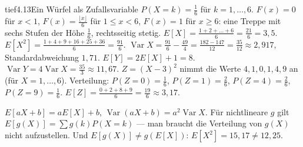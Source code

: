 \begin{loesungkarte}{tief}{4.13}{Ein Würfel als Zufallsvariable}
$P(X = k) = \frac16$ für $k = 1, \dots, 6$. $F(x) = 0$ für $x < 1$, $F(x) = \frac{\lfloor x\rfloor}6$ für $1\le x < 6$, $F(x) = 1$ für $x\ge6$: eine Treppe mit sechs Stufen der Höhe $\frac16$, rechtsseitig stetig.
$E[X] = \frac{1 + 2 + \dots + 6}6 = \frac{21}6 = 3{,}5$. $E[X^{2}] = \frac{1 + 4 + 9 + 16 + 25 + 36}6 = \frac{91}6$. $\operatorname{Var}X = \frac{91}6 - \frac{49}4 = \frac{182 - 147}{12} = \frac{35}{12}\approx2{,}917$, Standardabweichung $1{,}71$.
$E[Y] = 2E[X] + 1 = 8$. $\operatorname{Var}Y = 4\operatorname{Var}X = \frac{35}3\approx11{,}67$.
$Z = (X - 3)^{2}$ nimmt die Werte $4, 1, 0, 1, 4, 9$ an (für $X = 1, \dots, 6$). Verteilung: $P(Z = 0) = \frac16$, $P(Z = 1) = \frac26$, $P(Z = 4) = \frac26$, $P(Z = 9) = \frac16$. $E[Z] = \frac{0 + 2 + 8 + 9}6 = \frac{19}6\approx3{,}17$.
\begin{mitnehmen}\kastentext
$E[aX + b] = aE[X] + b$, $\operatorname{Var}(aX + b) = a^{2}\operatorname{Var}X$. Für nichtlineare $g$ gilt $E[g(X)] = \sum g(k)P(X = k)$ --- man braucht die Verteilung von $g(X)$ nicht aufzustellen. Und $E[g(X)]\neq g(E[X])$: $E[X^{2}] = 15{,}17\neq12{,}25$.
\end{mitnehmen}
\end{loesungkarte}

